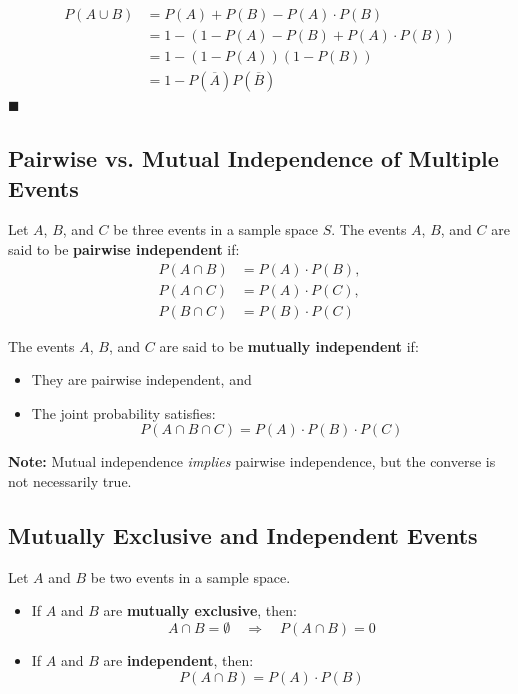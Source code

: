\documentclass[twoside]{book}
\begin{document}
\begin{align*}
    P(A \cup B) &= P(A) + P(B) - P(A)\cdot P(B) \\
    &= 1 - \left(1 - P(A) - P(B) + P(A)\cdot P(B)\right) \\
    &= 1- (1-P(A))(1-P(B)) \\
    &= 1 - P(\overline{A})P(\overline{B})
\end{align*}
\hfill\(\blacksquare\)

\subsection{Pairwise vs. Mutual Independence of Multiple Events}

Let \( A \), \( B \), and \( C \) be three events in a sample space \( S \). The events \( A \), \( B \), and \( C \) are said to be \textbf{pairwise independent} if:
\[
\begin{aligned}
P(A \cap B) &= P(A) \cdot P(B), \\
P(A \cap C) &= P(A) \cdot P(C), \\
P(B \cap C) &= P(B) \cdot P(C)
\end{aligned}
\]

The events \( A \), \( B \), and \( C \) are said to be \textbf{mutually independent} if:
\begin{itemize}
    \item They are pairwise independent, and
    \item The joint probability satisfies:
    \[
    P(A \cap B \cap C) = P(A) \cdot P(B) \cdot P(C)
    \]
\end{itemize}

\textbf{Note:} Mutual independence \emph{implies} pairwise independence, but the converse is not necessarily true.

\subsection{Mutually Exclusive and Independent Events}

Let \( A \) and \( B \) be two events in a sample space.

\begin{itemize}
    \item If \( A \) and \( B \) are \textbf{mutually exclusive}, then:
    \[
    A \cap B = \emptyset \quad \Rightarrow \quad P(A \cap B) = 0
    \]

    \item If \( A \) and \( B \) are \textbf{independent}, then:
    \[
    P(A \cap B) = P(A) \cdot P(B)
    \]
\end{itemize}
\end{document}
